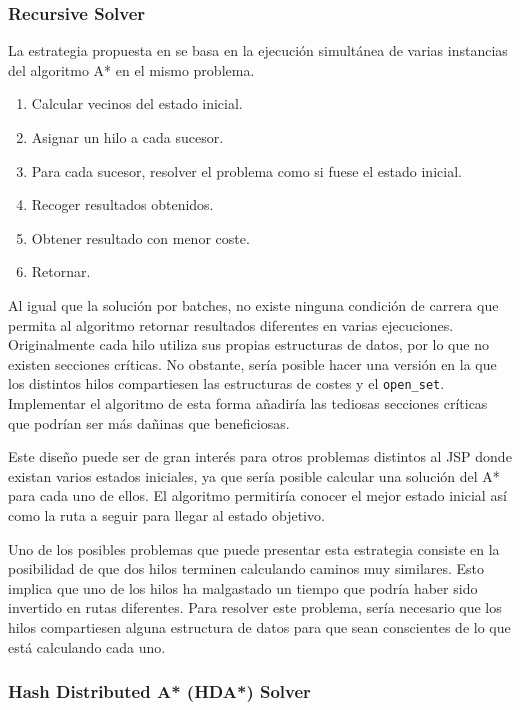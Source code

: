 \subsubsection{Recursive Solver}

La estrategia propuesta en \cite{Zag17} se basa en la ejecución
simultánea de varias instancias del algoritmo A* en el mismo problema.
\begin{enumerate}[start=0, itemsep=0.25px]
    \item Calcular vecinos del estado inicial.
    \item Asignar un hilo a cada sucesor.
    \item Para cada sucesor, resolver el problema como si fuese el estado inicial.
    \item Recoger resultados obtenidos.
    \item Obtener resultado con menor coste.
    \item Retornar.
\end{enumerate}

Al igual que la solución por batches,
no existe ninguna condición de carrera que permita
al algoritmo retornar resultados diferentes
en varias ejecuciones.
Originalmente cada hilo utiliza sus propias estructuras
de datos, por lo que no existen secciones críticas.
No obstante, sería posible hacer una versión en la que
los distintos hilos compartiesen las estructuras de costes
y el \lstinline{open_set}.
Implementar el algoritmo de esta forma añadiría las
tediosas secciones críticas que podrían ser más
dañinas que beneficiosas.

Este diseño puede ser de gran interés para otros problemas
distintos al JSP donde existan varios estados iniciales,
ya que sería posible calcular una solución del A*
para cada uno de ellos.
El algoritmo permitiría conocer el mejor estado inicial
así como la ruta a seguir para llegar al estado objetivo.

Uno de los posibles problemas que puede presentar esta
estrategia consiste en la posibilidad de que dos hilos
terminen calculando caminos muy similares.
Esto implica que uno de los hilos ha malgastado un tiempo
que podría haber sido invertido en rutas diferentes.
Para resolver este problema, sería necesario que
los hilos compartiesen alguna estructura de datos
para que sean conscientes de lo que está calculando cada uno.

\pagebreak

\subsubsection{Hash Distributed A* (HDA*) Solver}

